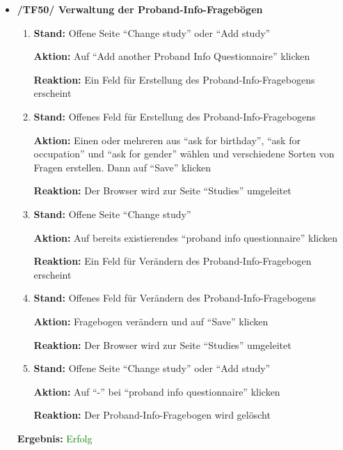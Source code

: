 \documentclass[a4paper]{scrreprt}
\begin{document}
\begin{itemize}
                \item \textbf{/TF50/ Verwaltung der Proband-Info-Frageb\"ogen}
                    \begin{enumerate}
                        \item \par \textbf{Stand: }Offene Seite ``Change study'' oder ``Add study''
                              \par \textbf{Aktion: }Auf ``Add another Proband Info Questionnaire'' klicken
                              \par \textbf{Reaktion: }Ein Feld f\"ur Erstellung des Proband-Info-Fragebogens erscheint
                        \item \par \textbf{Stand: }Offenes Feld f\"ur Erstellung des Proband-Info-Fragebogens
                              \par \textbf{Aktion: }Einen oder mehreren aus ``ask for birthday'', ``ask for occupation'' und ``ask for gender'' w\"ahlen und verschiedene Sorten von Fragen erstellen. Dann auf ``Save'' klicken
                              \par \textbf{Reaktion: }Der Browser wird zur Seite ``Studies'' umgeleitet
                        \item \par \textbf{Stand: }Offene Seite ``Change study''
                              \par \textbf{Aktion: }Auf bereits existierendes ``proband info questionnaire'' klicken
                              \par \textbf{Reaktion: }Ein Feld f\"ur Ver\"andern des Proband-Info-Fragebogen erscheint
                        \item \par \textbf{Stand: }Offenes Feld f\"ur Ver\"andern des Proband-Info-Fragebogens
                              \par \textbf{Aktion: }Fragebogen ver\"andern und auf ``Save'' klicken
                              \par \textbf{Reaktion: }Der Browser wird zur Seite ``Studies'' umgeleitet
                        \item \par \textbf{Stand: }Offene Seite ``Change study'' oder ``Add study''
                              \par \textbf{Aktion: }Auf ``-'' bei ``proband info questionnaire'' klicken
                              \par \textbf{Reaktion: }Der Proband-Info-Fragebogen wird gel\"oscht
                    \end{enumerate}
					\vspace*{0.3cm}
		           \par \textbf{Ergebnis: }\textcolor{green}{Erfolg}
		           \vspace*{0.6cm}  	
		

\end{itemize}
\end{document}
